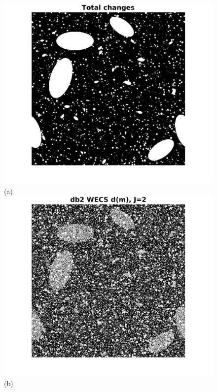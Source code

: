 \documentclass[journal]{IEEEtran}
\begin{document}
\begin{figure}[htp!]
\includegraphics[scale=.1]{../../figs/total_changes}(a)
\includegraphics[scale=.1]{../../figs/corr_changes_dm}(b)

\end{figure}
\end{document}
